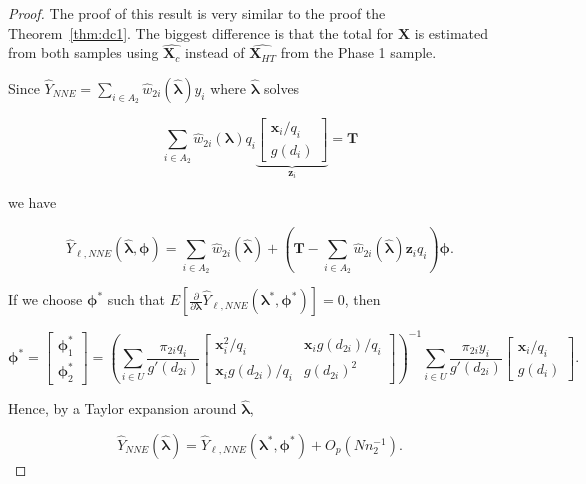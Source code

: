 \documentclass[12pt]{article}
\renewcommand{\bf}[1]{\mathbf{#1}}
\begin{document}
\begin{proof}
  The proof of this result is very similar to the proof the
  Theorem~\ref{thm:dc1}. The biggest difference is that the total for $\bf X$ is
  estimated from both samples using $\hat{\bf X_c}$ instead of $\hat{\bf
  X_{HT}}$ from the Phase 1 sample.

  Since $\hat Y_{NNE} = \sum_{i \in A_2} \hat w_{2i}(\hat{\bm \lambda})y_i$ where
  $\hat{\bm \lambda}$ solves

  \begin{equation}
    \sum_{i \in A_2} \hat w_{2i}(\bm \lambda) q_i
    \underbrace{
    \begin{bmatrix} 
      \bf x_i / q_i \\ g(d_i)
  \end{bmatrix}}_{\bf z_i} = \bf T
  \end{equation}

  we have 

  $$\hat Y_{\ell, NNE} (\hat{\bm \lambda}, \bm \phi) = \sum_{i \in A_2} \hat
  w_{2i}(\hat{\bm \lambda}) + \left(\bf T - \sum_{i \in A_2} \hat
  w_{2i}(\hat{\bm \lambda}) \bf z_i q_i\right) \bm \phi.$$

  If we choose $\bm \phi^*$ such that $E\left[\frac{\partial}{\partial \bm \lambda} 
    \hat Y_{\ell, NNE}(\bm \lambda^*, \bm \phi^*)\right] = 0$, then

  $$\bm \phi^* =
  \begin{bmatrix}
    \bm \phi^*_1 \\ \bm \phi^*_2
  \end{bmatrix} = 
  \left(\sum_{i \in U} \frac{\pi_{2i} q_i}{g'(d_{2i})} 
  \begin{bmatrix}
    \bf x_i^2 / q_i & \bf x_i g(d_{2i}) / q_i \\
    \bf x_i g(d_{2i}) / q_i & g(d_{2i})^2
  \end{bmatrix}
  \right)^{-1}
  \sum_{i \in U} \frac{\pi_{2i} y_i}{g'(d_{2i})} 
  \begin{bmatrix} \bf x_i / q_i \\ g(d_i) \end{bmatrix}.
  $$

  Hence, by a Taylor expansion around $\hat{\bm \lambda}$,
  
  $$\hat Y_{NNE}(\hat{\bm \lambda}) = \hat Y_{\ell, NNE}(\bm \lambda^*, 
  \bm \phi^*) + O_p(Nn_2^{-1}).$$

\end{proof}
\end{document}
